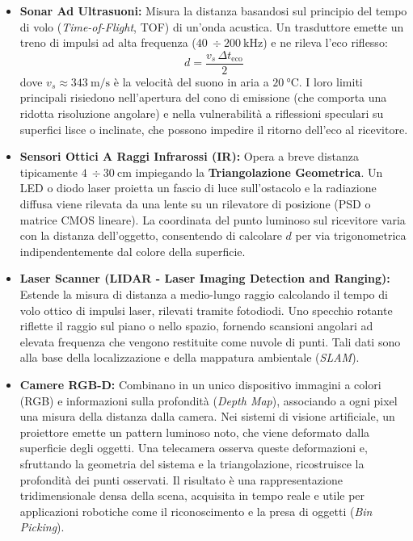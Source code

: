 ﻿\documentclass[11pt, a4paper]{article}
\begin{document}
\begin{itemize}
    \item \textbf{Sonar Ad Ultrasuoni:} Misura la distanza basandosi sul principio del tempo di volo (\textit{Time-of-Flight}, TOF) di un'onda acustica. Un trasduttore emette un treno di impulsi ad alta frequenza ($\SI{40}{}\div\SI{200}{\kilo\hertz}$) e ne rileva l'eco riflesso:
    \[
        d = \frac{v_s \, \Delta t_{\text{eco}}}{2}
    \]
    dove $v_s \approx \SI{343}{\meter\per\second}$ è la velocità del suono in aria a $\SI{20}{\celsius}$. I loro limiti principali risiedono nell'apertura del cono di emissione (che comporta una ridotta risoluzione angolare) e nella vulnerabilità a riflessioni speculari su superfici lisce o inclinate, che possono impedire il ritorno dell'eco al ricevitore.

    \item \textbf{Sensori Ottici A Raggi Infrarossi (IR):} Opera a breve distanza tipicamente $\SI{4}{}\div\SI{30}{\centi\meter}$ impiegando la \textbf{Triangolazione Geometrica}. Un LED o diodo laser proietta un fascio di luce sull'ostacolo e la radiazione diffusa viene rilevata da una lente su un rilevatore di posizione (PSD o matrice CMOS lineare). La coordinata del punto luminoso sul ricevitore varia con la distanza dell'oggetto, consentendo di calcolare $d$ per via trigonometrica indipendentemente dal colore della superficie.

    \item \textbf{Laser Scanner (LIDAR - Laser Imaging Detection and Ranging):} Estende la misura di distanza a medio-lungo raggio calcolando il tempo di volo ottico di impulsi laser, rilevati tramite fotodiodi. Uno specchio rotante riflette il raggio sul piano o nello spazio, fornendo scansioni angolari ad elevata frequenza che vengono restituite come nuvole di punti. Tali dati sono alla base della localizzazione e della mappatura ambientale (\textit{SLAM}).

     \item \textbf{Camere RGB-D:} Combinano in un unico dispositivo immagini a colori (RGB) e informazioni sulla profondità (\textit{Depth Map}), associando a ogni pixel una misura della distanza dalla camera. Nei sistemi di visione artificiale, un proiettore emette un pattern luminoso noto, che viene deformato dalla superficie degli oggetti. Una telecamera osserva queste deformazioni e, sfruttando la geometria del sistema e la triangolazione, ricostruisce la profondità dei punti osservati. Il risultato è una rappresentazione tridimensionale densa della scena, acquisita in tempo reale e utile per applicazioni robotiche come il riconoscimento e la presa di oggetti (\textit{Bin Picking}).
\end{itemize}
\end{document}
